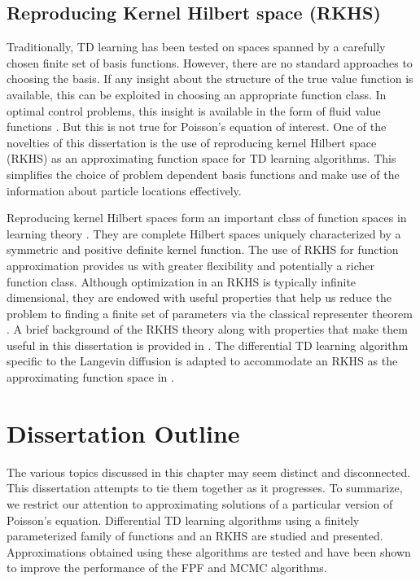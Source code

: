 \subsection{Reproducing Kernel Hilbert space (RKHS)}
\label{s:rkhs}
Traditionally, TD learning has been tested on spaces spanned by a carefully chosen finite set of basis functions. However, there are no standard approaches to choosing the basis.  If any insight about the structure of the true value function is available, this can be exploited in choosing an appropriate function class. In optimal control problems, this insight is available in the form of fluid value functions \cite{ctcn,huachemehmeysur11}. But this is not true for Poisson's equation of interest. One of the novelties of this dissertation is the use of reproducing kernel Hilbert space (RKHS) as an approximating function space for TD learning algorithms. This simplifies the choice of problem dependent basis functions and make use of the information about particle locations effectively. 
 
Reproducing kernel Hilbert spaces form an important class of function spaces in learning theory \cite{aro50, schsmo01}. They are complete Hilbert spaces uniquely characterized by a symmetric and positive definite kernel function. The use of RKHS for function approximation provides us with greater flexibility and potentially a richer function class. Although optimization in an RKHS is typically infinite dimensional, they are endowed with useful properties that help us reduce the problem to finding a finite set of parameters via the classical representer theorem \cite{kimwah71, schhersmo01}. A brief background of the RKHS theory along with properties that make them useful in this dissertation is provided in . The differential TD learning algorithm specific to the Langevin diffusion is adapted to accommodate an RKHS as the approximating function space in .
 

\section{Dissertation Outline}
\label{s:outline}
The various topics discussed in this chapter may seem distinct and disconnected. This dissertation attempts to tie them together as it progresses. To summarize, we restrict our attention to approximating solutions of a particular version of Poisson's equation. Differential TD learning algorithms using a finitely parameterized family of functions and an RKHS are studied and presented. Approximations obtained using these algorithms are tested and have been shown to improve the performance of the FPF and MCMC algorithms. 

